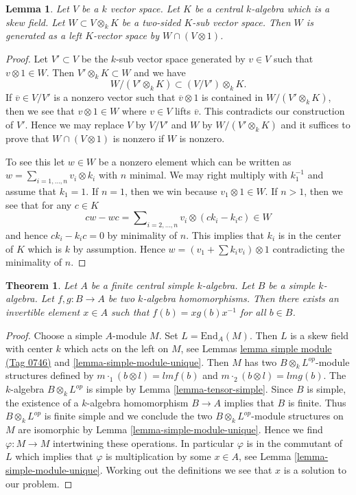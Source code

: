 \documentclass{amsart}
\theoremstyle{plain}
\newtheorem{theorem}[subsection]{Theorem}
\newtheorem{lemma}[subsection]{Lemma}
\theoremstyle{definition}
\theoremstyle{remark}
\numberwithin{equation}{subsection}
\begin{document}
\begin{lemma}
\label{lemma-generate-two-sided-sub}
Let $V$ be a $k$ vector space. Let $K$ be a central $k$-algebra
which is a skew field. Let $W \subset V \otimes_k K$ be a two-sided
$K$-sub vector space. Then $W$ is generated as a left $K$-vector
space by $W \cap (V \otimes 1)$.
\end{lemma}

\begin{proof}
Let $V' \subset V$ be the $k$-sub vector space generated by $v \in V$
such that $v \otimes 1 \in W$. Then $V' \otimes_k K \subset W$ and
we have
$$
W/(V' \otimes_k K)  \subset  (V/V') \otimes_k K.
$$
If $\overline{v} \in V/V'$ is a nonzero vector such that
$\overline{v} \otimes 1$ is contained in $W/(V' \otimes_k K)$,
then we see that $v \otimes 1 \in W$ where $v \in V$ lifts $\overline{v}$.
This contradicts our construction of $V'$. Hence we may replace
$V$ by $V/V'$ and $W$ by $W/(V' \otimes_k K)$ and it suffices to prove
that $W \cap (V \otimes 1)$ is nonzero if $W$ is nonzero.

\medskip\noindent
To see this let $w \in W$ be a nonzero element which can be written
as $w = \sum_{i = 1, \ldots, n} v_i \otimes k_i$ with $n$ minimal.
We may right multiply with $k_1^{-1}$ and assume that $k_1 = 1$.
If $n = 1$, then we win because $v_1 \otimes 1 \in W$.
If $n > 1$, then we see that for any $c \in K$
$$
c w - w c = \sum\nolimits_{i = 2, \ldots, n} v_i \otimes (c k_i - k_i c) \in W
$$
and hence $c k_i - k_i c = 0$ by minimality of $n$.
This implies that $k_i$ is in the center of $K$ which is $k$ by
assumption. Hence $w = (v_1 + \sum k_i v_i) \otimes 1$ contradicting
the minimality of $n$.
\end{proof}

\begin{theorem}
\label{theorem-skolem-noether}
Let $A$ be a finite central simple $k$-algebra. Let $B$ be a simple
$k$-algebra. Let $f, g : B \to A$ be two $k$-algebra homomorphisms.
Then there exists an invertible element $x \in A$ such that
$f(b) = xg(b)x^{-1}$ for all $b \in B$.
\end{theorem}

\begin{proof}
Choose a simple $A$-module $M$. Set $L = \text{End}_A(M)$.
Then $L$ is a skew field with center $k$ which acts on the left on $M$, see
Lemmas \href{https://stacks.math.columbia.edu/tag/0746}{lemma simple module (Tag 0746)} and \ref{lemma-simple-module-unique}.
Then $M$ has two $B \otimes_k L^{op}$-module structures defined by
$m \cdot_1 (b \otimes l) = lmf(b)$ and $m \cdot_2 (b \otimes l) = lmg(b)$.
The $k$-algebra $B \otimes_k L^{op}$ is simple by
Lemma \ref{lemma-tensor-simple}. Since $B$ is simple, the existence of a
$k$-algebra homomorphism $B \to A$ implies that $B$ is finite. Thus
$B \otimes_k L^{op}$ is finite simple and we conclude the two
$B \otimes_k L^{op}$-module structures on $M$
are isomorphic by Lemma \ref{lemma-simple-module-unique}.
Hence we find $\varphi : M \to M$ intertwining these operations.
In particular $\varphi$ is in the commutant of $L$ which implies that
$\varphi$ is multiplication by some $x \in A$, see
Lemma \ref{lemma-simple-module-unique}. Working out the definitions we see
that $x$ is a solution to our problem.
\end{proof}
\end{document}
